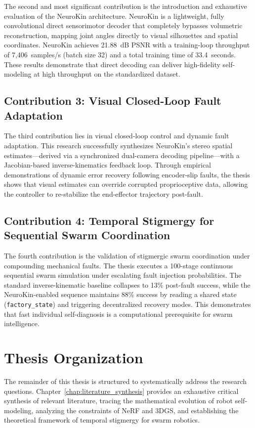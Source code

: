 \documentclass[12pt,a4paper,oneside]{report}
\begin{document}
The second and most significant contribution is the introduction and exhaustive evaluation of the NeuroKin architecture. NeuroKin is a lightweight, fully convolutional direct sensorimotor decoder that completely bypasses volumetric reconstruction, mapping joint angles directly to visual silhouettes and spatial coordinates. NeuroKin achieves 21.88~dB PSNR with a training-loop throughput of 7,406~samples/s (batch size 32) and a total training time of 33.4~seconds. These results demonstrate that direct decoding can deliver high-fidelity self-modeling at high throughput on the standardized dataset.
\subsection{Contribution 3: Visual Closed-Loop Fault Adaptation}
\label{subsec:contrib_closed_loop}

The third contribution lies in visual closed-loop control and dynamic fault adaptation. This research successfully synthesizes NeuroKin's stereo spatial estimates---derived via a synchronized dual-camera decoding pipeline---with a Jacobian-based inverse-kinematics feedback loop. Through empirical demonstrations of dynamic error recovery following encoder-slip faults, the thesis shows that visual estimates can override corrupted proprioceptive data, allowing the controller to re-stabilize the end-effector trajectory post-fault.
\subsection{Contribution 4: Temporal Stigmergy for Sequential Swarm Coordination}
\label{subsec:contrib_stigmergy}

The fourth contribution is the validation of stigmergic swarm coordination under compounding mechanical faults. The thesis executes a 100-stage continuous sequential swarm simulation under escalating fault injection probabilities. The standard inverse-kinematic baseline collapses to 13\% post-fault success, while the NeuroKin-enabled sequence maintains 88\% success by reading a shared state (\texttt{factory\_state}) and triggering decentralized recovery modes. This demonstrates that fast individual self-diagnosis is a computational prerequisite for swarm intelligence.
\section{Thesis Organization}
\label{sec:thesis_organization}

The remainder of this thesis is structured to systematically address the research questions. Chapter~\ref{chap:literature_synthesis} provides an exhaustive critical synthesis of relevant literature, tracing the mathematical evolution of robot self-modeling, analyzing the constraints of NeRF and 3DGS, and establishing the theoretical framework of temporal stigmergy for swarm robotics.
\end{document}
